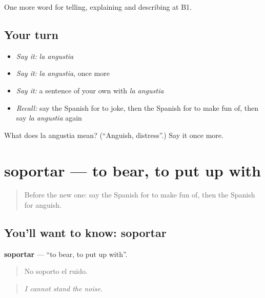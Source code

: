 \begin{grammarlens}[title={What you've built}]
One more word for telling, explaining and describing at B1.
\end{grammarlens}

\subsection*{Your turn}
\begin{itemize}
\raggedright
  \item \emph{Say it:} \emph{la angustia}
  \item \emph{Say it:} \emph{la angustia}, once more
  \item \emph{Say it:} a sentence of your own with \emph{la angustia}
  \item \emph{Recall:} say the Spanish for to joke, then the Spanish for to make fun of, then say \emph{la angustia} again
\end{itemize}

\begin{tcolorbox}[breakable,colback=teal!4,colframe=teal!35!black,title={Before you move on}]
What does la angustia mean? (\textquotedblleft{}Anguish, distress\textquotedblright{}.) Say it once more.
\end{tcolorbox}
\section[soportar]{soportar — to bear, to put up with}

\label{lesson:ES-C719-soportar}



\begin{quote}
Before the new one: say the Spanish for to make fun of, then the Spanish for anguish.
\end{quote}

\subsection*{You'll want to know: soportar}
\textbf{soportar} — \textquotedblleft{}to bear, to put up with\textquotedblright{}.

\begin{quote}
No soporto el ruido.
\end{quote}

\begin{quote}
\emph{I cannot stand the noise.}
\end{quote}

